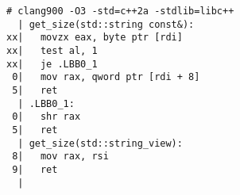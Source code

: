 \begin{lstlisting}[language={},numbers=none,title=\href{https://godbolt.org/z/br9Mfz}{\texttt{godbolt.org/z/br9Mfz}}]
# clang900 -O3 -std=c++2a -stdlib=libc++
  | get_size(std::string const&):
xx|   movzx eax, byte ptr [rdi]
xx|   test al, 1
xx|   je .LBB0_1
 0|   mov rax, qword ptr [rdi + 8]
 5|   ret
  | .LBB0_1:
 0|   shr rax
 5|   ret
  | get_size(std::string_view):
 8|   mov rax, rsi
 9|   ret
  |
\end{lstlisting}
